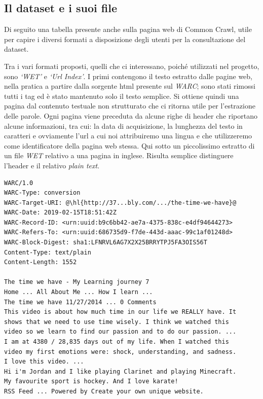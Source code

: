 \documentclass{article}
\newcommand{\WET}{\textit{WET}}
\newcommand{\CC}{Common Crawl}
\newcommand{\pt}{\textit{plain text}}
\begin{document}
\subsection{Il dataset e i suoi file}

Di seguito una tabella presente anche sulla pagina web di \CC{}, utile per capire i diversi formati a disposizione degli utenti per la consultazione del dataset.

\commonCrawlFilesTable

Tra i vari formati proposti, quelli che ci interessano, poiché utilizzati nel progetto, sono \textit{`WET'} e \textit{`Url Index'}. I primi contengono il testo estratto dalle pagine web, nella pratica a partire dalla sorgente html presente sul \textit{WARC}; sono stati rimossi tutti i tag ed è stato mantenuto solo il testo semplice. Si ottiene quindi una pagina dal contenuto testuale non strutturato che ci ritorna utile per l'estrazione delle parole. Ogni pagina viene preceduta da alcune righe di header che riportano alcune informazioni, tra cui: la data di acquisizione, la lunghezza del testo in caratteri e ovviamente l'url a cui noi attribuiremo una lingua e che utilizzeremo come identificatore della pagina web stessa. Qui sotto un piccolissimo estratto di un file \WET{} relativo a una pagina in inglese. Risulta semplice distinguere l'header e il relativo \pt{}.

\begin{verbatim}
WARC/1.0
WARC-Type: conversion
WARC-Target-URI: @\hl{http://37...bly.com/.../the-time-we-have}@
WARC-Date: 2019-02-15T18:51:42Z
WARC-Record-ID: <urn:uuid:b9c6bb42-ae7a-4375-838c-e4df94644273>
WARC-Refers-To: <urn:uuid:686735d9-f7de-443d-aaac-99c1af01248d>
WARC-Block-Digest: sha1:LFNRVL6AG7X2X25BRRYTPJ5FA3OIS56T
Content-Type: text/plain
Content-Length: 1552

The time we have - My Learning journey 7
Home ... All About Me ... How I learn ...
The time we have 11/27/2014 ... 0 Comments
This video is about how much time in our life we REALLY have. It 
shows that we need to use time wisely. I think we watched this 
video so we learn to find our passion and to do our passion. ...
I am at 4380 / 28,835 days out of my life. When I watched this 
video my first emotions were: shock, understanding, and sadness. 
I love this video. ...
Hi i'm Jordan and I like playing Clarinet and playing Minecraft. 
My favourite sport is hockey. And I love karate!
RSS Feed ... Powered by Create your own unique website.
\end{verbatim}
\end{document}
